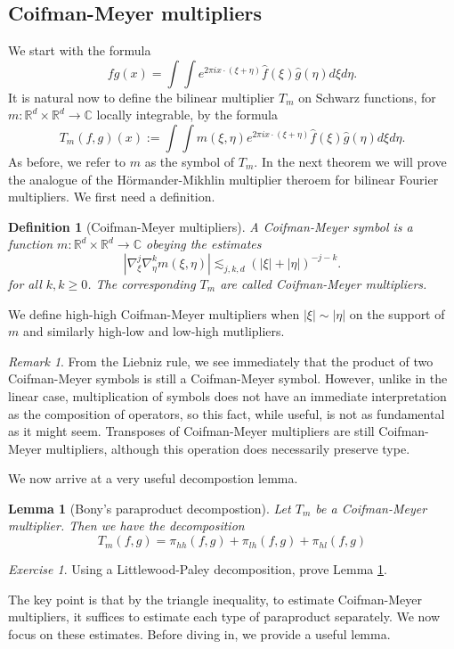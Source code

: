 \documentclass[11pt]{article}
\newtheorem{lem}[thm]{Lemma}
\newtheorem*{defn}{Definition}
\theoremstyle{remark}
\newtheorem{exr}{Exercise}
\newtheorem*{rmk}{Remark}
\newcommand{\1}{\textbf{1}}
\newcommand{\lle}{\lesssim}
\newcommand{\bbR}{\mathbb{R}}
\newcommand{\bbC}{\mathbb{C}}
\begin{document}
\subsection*{Coifman-Meyer multipliers}
We start with the formula
\[
fg(x) = \int \int e^{2 \pi i x \cdot (\xi + \eta)} \hat{f}(\xi) \hat{g}(\eta) d\xi d\eta.
\]
It is natural now to define the bilinear multiplier $T_m$ on Schwarz functions, for $m: \bbR^d \times \bbR^d \to \bbC$ locally integrable, by the formula
\[
T_m(f,g)(x):= \int \int m(\xi,\eta) e^{2 \pi i x \cdot (\xi + \eta)} \hat{f}(\xi) \hat{g}(\eta) d\xi d\eta.
\]
As before, we refer to $m$ as the symbol of $T_m$. In the next theorem we will prove the analogue of the H\"ormander-Mikhlin multiplier theroem for bilinear Fourier multipliers. We first need a definition.

\begin{defn}[Coifman-Meyer multipliers]
A Coifman-Meyer symbol is a function $m : \bbR^d \times \bbR^d \to \bbC$ obeying the estimates
\[
|\nabla_\xi^{j} \nabla_\eta^k m(\xi,\eta)| \lle_{j,k,d} (|\xi| + |\eta|)^{-j-k}.
\]
for all $k, k \geq 0$. The corresponding $T_m$ are called Coifman-Meyer multipliers.
\end{defn}
We define high-high Coifman-Meyer multipliers when $|\xi| \sim |\eta|$ on the support of $m$ and similarly high-low and low-high mutlipliers.
\begin{rmk}
From the Liebniz rule, we see immediately that the product of two Coifman-Meyer symbols is still a Coifman-Meyer symbol. However, unlike in the linear case, multiplication of symbols does not have an immediate interpretation as the composition of operators, so this fact, while useful, is not as fundamental as it might seem. Transposes of Coifman-Meyer multipliers are still Coifman-Meyer multipliers, although this operation does necessarily preserve type.
\end{rmk}
We now arrive at a very useful decompostion lemma.
\begin{lem}[Bony's paraproduct decompostion]
Let $T_m$ be a Coifman-Meyer multiplier. Then we have the decomposition
\[
T_m(f,g) = \pi_{hh}(f,g) + \pi_{lh}(f,g) + \pi_{hl}(f,g)
\]
\label{lem:Bony}
\end{lem}
\begin{exr}
Using a Littlewood-Paley decomposition, prove Lemma \ref{lem:Bony}.
\end{exr}
The key point is that by the triangle inequality, to estimate Coifman-Meyer multipliers, it suffices to estimate each type of paraproduct separately. We now focus on these estimates. Before diving in, we provide a useful lemma.
\end{document}
